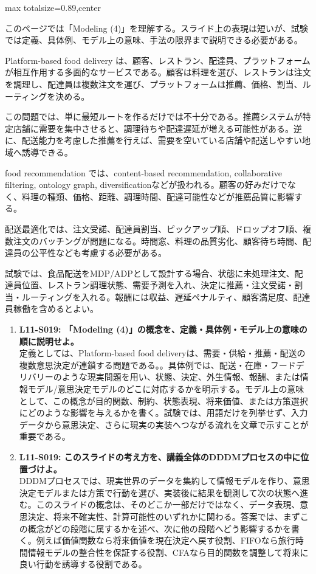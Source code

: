 \begin{minipage}[t]{0.58\textwidth}
\begin{adjustbox}{max totalsize={\textwidth}{0.89\textheight},center}
\begin{minipage}{\textwidth}\scriptsize
{}このページでは「Modeling (4)」を理解する。スライド上の表現は短いが、試験では定義、具体例、モデル上の意味、手法の限界まで説明できる必要がある。\par
Platform-based food delivery は、顧客、レストラン、配達員、プラットフォームが相互作用する多面的なサービスである。顧客は料理を選び、レストランは注文を調理し、配達員は複数注文を運び、プラットフォームは推薦、価格、割当、ルーティングを決める。\par
この問題では、単に最短ルートを作るだけでは不十分である。推薦システムが特定店舗に需要を集中させると、調理待ちや配達遅延が増える可能性がある。逆に、配送能力を考慮した推薦を行えば、需要を空いている店舗や配送しやすい地域へ誘導できる。\par
food recommendation では、content-based recommendation, collaborative filtering, ontology graph, diversificationなどが扱われる。顧客の好みだけでなく、料理の種類、価格、距離、調理時間、配達可能性などが推薦品質に影響する。\par
配送最適化では、注文受諾、配達員割当、ピックアップ順、ドロップオフ順、複数注文のバッチングが問題になる。時間窓、料理の品質劣化、顧客待ち時間、配達員の公平性なども考慮する必要がある。\par
試験では、食品配送をMDP/ADPとして設計する場合、状態に未処理注文、配達員位置、レストラン調理状態、需要予測を入れ、決定に推薦・注文受諾・割当・ルーティングを入れる。報酬には収益、遅延ペナルティ、顧客満足度、配達員稼働を含めるとよい。\par{}\begin{enumerate}\item \textbf{L11-S019: 「Modeling (4)」の概念を、定義・具体例・モデル上の意味の順に説明せよ。}\\定義としては、Platform-based food deliveryは、需要・供給・推薦・配送の複数意思決定が連鎖する問題である。。具体例では、配送・在庫・フードデリバリーのような現実問題を用い、状態、決定、外生情報、報酬、または情報モデル/意思決定モデルのどこに対応するかを明示する。モデル上の意味として、この概念が目的関数、制約、状態表現、将来価値、または方策選択にどのような影響を与えるかを書く。試験では、用語だけを列挙せず、入力データから意思決定、さらに現実の実装へつながる流れを文章で示すことが重要である。\item \textbf{L11-S019: このスライドの考え方を、講義全体のDDDMプロセスの中に位置づけよ。}\\DDDMプロセスでは、現実世界のデータを集約して情報モデルを作り、意思決定モデルまたは方策で行動を選び、実装後に結果を観測して次の状態へ進む。このスライドの概念は、そのどこか一部だけではなく、データ表現、意思決定、将来不確実性、計算可能性のいずれかに関わる。答案では、まずこの概念がどの段階に属するかを述べ、次に他の段階へどう影響するかを書く。例えば価値関数なら将来価値を現在決定へ戻す役割、FIFOなら旅行時間情報モデルの整合性を保証する役割、CFAなら目的関数を調整して将来に良い行動を誘導する役割である。\end{enumerate}

\end{minipage}
\end{adjustbox}
\end{minipage}
